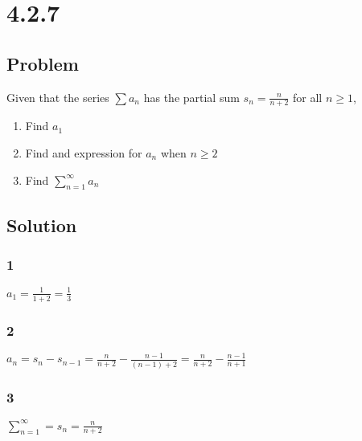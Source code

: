 \documentclass[12pt]{article}
\begin{document}
\section*{4.2.7}

\subsection*{Problem}
Given that the series $\sum a_n$ has the partial sum $s_n = \frac{n}{n+2}$ for all $n \geq 1$,
\begin{enumerate}
    \item Find $a_1$
    \item Find and expression for $a_n$ when $n \geq 2$
    \item Find $\sum_{n=1}^\infty a_n$
\end{enumerate}

\subsection*{Solution}

\subsubsection*{1}
$a_1 = \frac{1}{1+2} = \frac{1}{3}$

\subsubsection*{2}
$a_n = s_n - s_{n-1} = \frac{n}{n+2} - \frac{n-1}{(n-1)+2} = \frac{n}{n+2} - \frac{n-1}{n+1}$

\subsubsection*{3}
$\sum_{n=1}^\infty = s_n = \frac{n}{n+2}$
\end{document}
